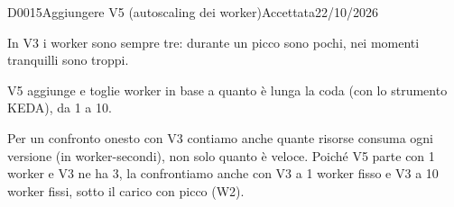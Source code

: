\begin{decisione}{D0015}{Aggiungere V5 (autoscaling dei worker)}{Accettata}{22/10/2026}

\contesto
In V3 i worker sono sempre tre: durante un picco sono pochi, nei momenti tranquilli sono troppi.

\scelta
V5 aggiunge e toglie worker in base a quanto è lunga la coda (con lo strumento KEDA), da 1 a 10.

\conseguenze
Per un confronto onesto con V3 contiamo anche quante risorse consuma ogni versione (in worker-secondi), non solo quanto è veloce. Poiché V5 parte con 1 worker e V3 ne ha 3, la confrontiamo anche con V3 a 1 worker fisso e V3 a 10 worker fissi, sotto il carico con picco (W2).

\end{decisione}
